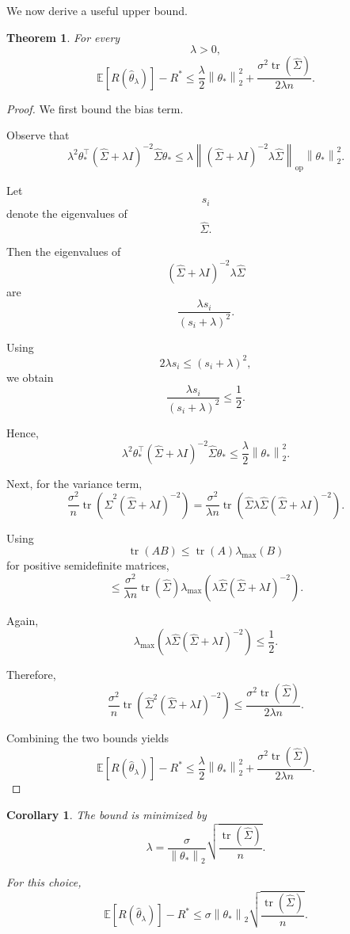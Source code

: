 \documentclass[12pt,oneside]{book}
\numberwithin{equation}{section}
\theoremstyle{definition}
\theoremstyle{plain}
\newtheorem{theorem}{Theorem}[section]
\newtheorem{corollary}{Corollary}[section]
\theoremstyle{remark}
\newcommand{\E}{\mathbb{E}}
\newcommand{\norm}[1]{\left\lVert #1 \right\rVert}
\newcommand{\tr}{\operatorname{tr}}
\begin{document}
We now derive a useful upper bound.

\begin{theorem}
For every
\[
\lambda>0,
\]
\[
\E[R(\widehat{\theta}_\lambda)]-R^*
\leq
\frac{\lambda}{2}\norm{\theta_*}_2^2
+
\frac{\sigma^2\tr(\widehat{\Sigma})}{2\lambda n}.
\]
\end{theorem}

\begin{proof}
We first bound the bias term.

Observe that
\[
\lambda^2
\theta_*^\top
(\widehat{\Sigma}+\lambda I)^{-2}
\widehat{\Sigma}
\theta_*
\leq
\lambda
\norm{
(\widehat{\Sigma}+\lambda I)^{-2}
\lambda\widehat{\Sigma}
}_{\mathrm{op}}
\norm{\theta_*}_2^2.
\]

Let
\[
s_i
\]
denote the eigenvalues of
\[
\widehat{\Sigma}.
\]

Then the eigenvalues of
\[
(\widehat{\Sigma}+\lambda I)^{-2}
\lambda\widehat{\Sigma}
\]
are
\[
\frac{\lambda s_i}{(s_i+\lambda)^2}.
\]

Using
\[
2\lambda s_i
\leq
(s_i+\lambda)^2,
\]
we obtain
\[
\frac{\lambda s_i}{(s_i+\lambda)^2}
\leq
\frac{1}{2}.
\]

Hence,
\[
\lambda^2
\theta_*^\top
(\widehat{\Sigma}+\lambda I)^{-2}
\widehat{\Sigma}
\theta_*
\leq
\frac{\lambda}{2}\norm{\theta_*}_2^2.
\]

Next, for the variance term,
\[
\frac{\sigma^2}{n}
\tr\left(
\widehat{\Sigma}^2
(\widehat{\Sigma}+\lambda I)^{-2}
\right)
=
\frac{\sigma^2}{\lambda n}
\tr\left(
\widehat{\Sigma}
\lambda\widehat{\Sigma}
(\widehat{\Sigma}+\lambda I)^{-2}
\right).
\]

Using
\[
\tr(AB)
\leq
\tr(A)\lambda_{\max}(B)
\]
for positive semidefinite matrices,
\[
\leq
\frac{\sigma^2}{\lambda n}
\tr(\widehat{\Sigma})
\lambda_{\max}
\left(
\lambda\widehat{\Sigma}
(\widehat{\Sigma}+\lambda I)^{-2}
\right).
\]

Again,
\[
\lambda_{\max}
\left(
\lambda\widehat{\Sigma}
(\widehat{\Sigma}+\lambda I)^{-2}
\right)
\leq
\frac{1}{2}.
\]

Therefore,
\[
\frac{\sigma^2}{n}
\tr\left(
\widehat{\Sigma}^2
(\widehat{\Sigma}+\lambda I)^{-2}
\right)
\leq
\frac{\sigma^2\tr(\widehat{\Sigma})}{2\lambda n}.
\]

Combining the two bounds yields
\[
\E[R(\widehat{\theta}_\lambda)]-R^*
\leq
\frac{\lambda}{2}\norm{\theta_*}_2^2
+
\frac{\sigma^2\tr(\widehat{\Sigma})}{2\lambda n}.
\]
\end{proof}

\begin{corollary}
The bound is minimized by
\[
\lambda
=
\frac{\sigma}{\norm{\theta_*}_2}
\sqrt{
\frac{\tr(\widehat{\Sigma})}{n}
}.
\]

For this choice,
\[
\E[R(\widehat{\theta}_\lambda)]-R^*
\leq
\sigma\norm{\theta_*}_2
\sqrt{
\frac{\tr(\widehat{\Sigma})}{n}
}.
\]
\end{corollary}
\end{document}
